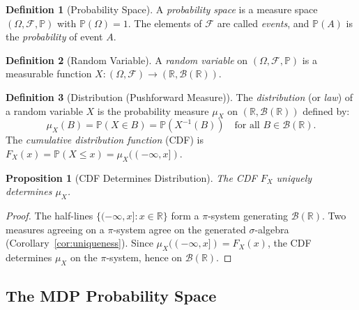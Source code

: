\documentclass[11pt,a4paper]{article}
\theoremstyle{definition}
\newtheorem{definition}{Definition}[section]
\theoremstyle{plain}
\newtheorem{proposition}[theorem]{Proposition}
\theoremstyle{remark}
\newcommand{\R}{\mathbb{R}}
\newcommand{\Prob}{\mathbb{P}}
\newcommand{\Borel}{\mathcal{B}}
\begin{document}
\begin{definition}[Probability Space]
\label{def:prob_space}
A \emph{probability space} is a measure space $(\Omega, \mathcal{F}, \Prob)$ with
$\Prob(\Omega) = 1$. The elements of $\mathcal{F}$ are called \emph{events}, and
$\Prob(A)$ is the \emph{probability} of event $A$.
\end{definition}

\begin{definition}[Random Variable]
\label{def:rv}
A \emph{random variable} on $(\Omega, \mathcal{F}, \Prob)$ is a measurable function
$X: (\Omega, \mathcal{F}) \to (\R, \Borel(\R))$.
\end{definition}

\begin{definition}[Distribution (Pushforward Measure)]
\label{def:distribution}
The \emph{distribution} (or \emph{law}) of a random variable $X$ is the probability
measure $\mu_X$ on $(\R, \Borel(\R))$ defined by:
\begin{equation}
    \mu_X(B) = \Prob(X \in B) = \Prob(X^{-1}(B)) \quad \text{for all } B \in \Borel(\R).
\end{equation}
The \emph{cumulative distribution function} (CDF) is $F_X(x) = \Prob(X \leq x) = \mu_X((-\infty, x])$.
\end{definition}

\begin{proposition}[CDF Determines Distribution]
\label{prop:cdf_determines}
The CDF $F_X$ uniquely determines $\mu_X$.
\end{proposition}

\begin{proof}
The half-lines $\{(-\infty, x] : x \in \R\}$ form a $\pi$-system generating
$\Borel(\R)$. Two measures agreeing on a $\pi$-system agree on the generated
$\sigma$-algebra (Corollary~\ref{cor:uniqueness}). Since $\mu_X((-\infty, x]) = F_X(x)$,
the CDF determines $\mu_X$ on the $\pi$-system, hence on $\Borel(\R)$.
\end{proof}

\subsection{The MDP Probability Space}
\label{subsec:mdp_space}
\end{document}
